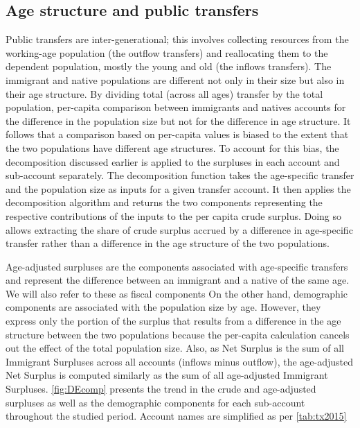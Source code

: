 \subsection{Age structure and public transfers}

Public transfers are inter-generational; this involves collecting resources from the working-age population (the outflow transfers) and reallocating them to the dependent population, mostly the young and old (the inflows transfers).
The immigrant and native populations are different not only in their size but also in their age structure.
By dividing total (across all ages) transfer by the total population, per-capita comparison between immigrants and natives accounts for the difference in the population size but not for the difference in age structure.
It follows that a comparison based on per-capita values is biased to the extent that the two populations have different age structures.
To account for this bias, the decomposition discussed earlier is applied to the surpluses in each account and sub-account separately.
The decomposition function takes the age-specific transfer and the population size as inputs for a given transfer account. It then applies the decomposition algorithm and returns the two components representing the respective contributions of the inputs to the per capita crude surplus.
Doing so allows extracting the share of crude surplus accrued by a difference in age-specific transfer rather than a difference in the age structure of the two populations.

\vspace{0.7em}\par
Age-adjusted surpluses are the components associated with age-specific transfers and represent the difference between an immigrant and a native of the same age.
We will also refer to these as fiscal components
On the other hand, demographic components are associated with the population size by age.
However, they express only the portion of the surplus that results from a difference in the age structure between the two populations because the per-capita calculation cancels out the effect of the total population size.
Also, as Net Surplus is the sum of all Immigrant Surpluses across all accounts (inflows minus outflow), the age-adjusted Net Surplus is computed similarly as the sum of all age-adjusted Immigrant Surpluses. \autoref{fig:DEcomp} presents the trend in the crude and age-adjusted surpluses as well as the demographic components for each sub-account throughout the studied period.
Account names are simplified as per \autoref{tab:tx2015}

